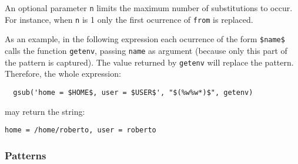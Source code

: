 An optional parameter \verb-n- limits 
the maximum number of substitutions to occur.
For instance, when \verb-n- is 1 only the first ocurrence of
\verb-from- is replaced.

As an example, in the following expression each ocurrence of the form
\verb-$name$- calls the function \verb|getenv|,
passing \verb|name| as argument
(because only this part of the pattern is captured).
The value returned by \verb|getenv| will replace the pattern.
Therefore, the whole expression:
\begin{verbatim}
  gsub('home = $HOME$, user = $USER$', "$(%w%w*)$", getenv)
\end{verbatim}
may return the string:
\begin{verbatim}
home = /home/roberto, user = roberto
\end{verbatim}

\subsubsection*{Patterns} \label{pm}

